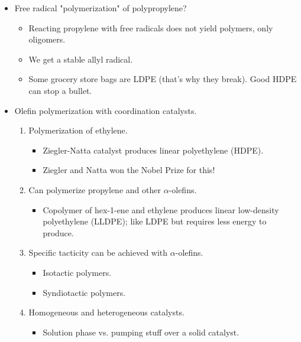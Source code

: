 \documentclass[../notes.tex]{subfiles}
\begin{document}
\begin{itemize}
\begin{itemize}
        \item Low glass transiton temperature and melts (40-60\%) at \SIrange{105}{115}{\celsius}.
        \item We \emph{cannot} make HDPE using free radical polymerization.
    \end{itemize}
    \item Free radical "polymerization" of polypropylene?
    \begin{itemize}
        \item Reacting propylene with free radicals does not yield polymers, only oligomers.
        \item We get a stable allyl radical.
        \item Some grocery store bags are LDPE (that's why they break). Good HDPE can stop a bullet.
    \end{itemize}
    \item Olefin polymerization with coordination catalysts.
    \begin{enumerate}
        \item Polymerization of ethylene.
        \begin{itemize}
            \item Ziegler-Natta catalyst produces linear polyethylene (HDPE).
            \item Ziegler and Natta won the Nobel Prize for this!
        \end{itemize}
        \item Can polymerize propylene and other $\alpha$-olefins.
        \begin{itemize}
            \item Copolymer of hex-1-ene and ethylene produces linear low-density polyethylene (LLDPE); like LDPE but requires less energy to produce.
        \end{itemize}
        \item Specific tacticity can be achieved with $\alpha$-olefins.
        \begin{itemize}
            \item Isotactic polymers.
            \item Syndiotactic polymers.
        \end{itemize}
        \item Homogeneous and heterogeneous catalysts.
        \begin{itemize}
            \item Solution phase vs. pumping stuff over a solid catalyst.
        \end{itemize}

\end{enumerate}
\end{itemize}
\end{document}
